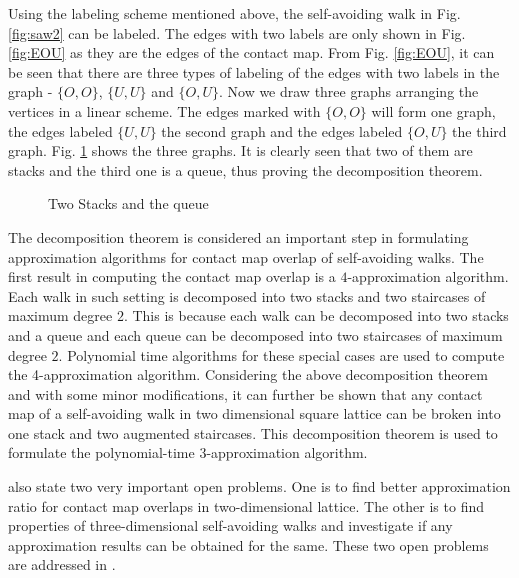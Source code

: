 Using the labeling scheme mentioned above, the self-avoiding walk in Fig. \ref{fig:saw2} can be labeled. The edges with two labels are only shown in Fig. \ref{fig:EOU} as they are the edges of the contact map. From Fig. \ref{fig:EOU}, it can be seen that there are three types of labeling of the edges with two labels in the graph - $\{O,O\}$, $\{U,U\}$ and $\{O,U\}$. Now we draw three graphs arranging the vertices in a linear scheme. The edges marked with $\{O,O\}$ will form one graph, the edges labeled $\{U,U\}$ the second graph and the edges labeled $\{O,U\}$ the third graph. Fig. \ref{fig:Two Stacks and the queue} shows the three graphs. It is clearly seen that two of them are stacks and the third one is a queue, thus proving the decomposition theorem.

\begin{figure}[ht]
\centering

 

\caption{Two Stacks and the queue}
 \label{fig:Two Stacks and the queue}
 \end{figure}

The decomposition theorem is considered an important step in formulating approximation algorithms for contact map overlap of self-avoiding walks. The first result in computing the contact map overlap is a $4$-approximation algorithm. Each walk in such setting is decomposed into two stacks and two staircases of maximum degree $2$. This is because each walk can be decomposed into two stacks and a queue and each queue can be decomposed into two staircases of maximum degree $2$. Polynomial time algorithms for these special cases are used to compute the 4-approximation algorithm. Considering the above decomposition theorem and with some minor modifications, it can further be shown that any contact map of a self-avoiding walk in two dimensional square lattice can be broken into one stack and two augmented staircases. This decomposition theorem is used to formulate the polynomial-time 3-approximation algorithm.

\citet{goip99} also state two very important open problems. One is to find better approximation ratio for contact map overlaps in two-dimensional lattice. The other is to find properties of three-dimensional self-avoiding walks and investigate if any approximation results can be obtained for the same. These two open problems are addressed in \citet{agmw07}. 
